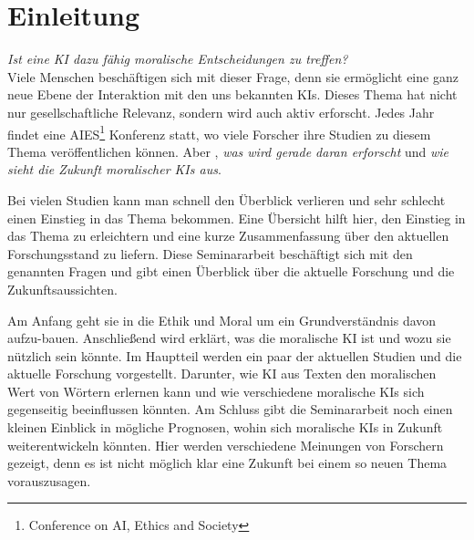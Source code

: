 \section{Einleitung}\label{sec:einleitung}

\textit{Ist eine KI dazu fähig moralische Entscheidungen zu treffen?} \\
Viele Menschen beschäftigen sich mit dieser Frage, denn sie ermöglicht eine
ganz neue Ebene der Interaktion mit den uns bekannten KIs.
Dieses Thema hat nicht nur gesellschaftliche Relevanz, sondern wird auch
aktiv erforscht.
Jedes Jahr findet eine AIES\footnote{Conference on AI, Ethics and Society} Konferenz statt, wo viele
Forscher ihre Studien zu diesem Thema veröffentlichen können.
Aber , \textit{was wird gerade daran erforscht} und \textit{wie sieht die Zukunft moralischer KIs aus}.

Bei vielen Studien kann man schnell den Überblick verlieren und sehr schlecht einen Einstieg in das Thema bekommen.
Eine Übersicht hilft hier, den Einstieg in das Thema zu erleichtern und eine kurze Zusammenfassung über
den aktuellen Forschungsstand zu liefern.
Diese Seminararbeit beschäftigt sich mit den genannten Fragen und gibt einen Überblick über die aktuelle Forschung und die Zukunftsaussichten.

Am Anfang geht sie in die Ethik und Moral um ein Grundverständnis davon aufzu-bauen.
Anschließend wird erklärt, was die moralische KI ist und wozu sie nützlich sein könnte.
Im Hauptteil werden ein paar der aktuellen Studien und die aktuelle Forschung vorgestellt.
Darunter, wie KI aus Texten den moralischen Wert von Wörtern erlernen kann und wie verschiedene moralische
KIs sich gegenseitig beeinflussen könnten.
Am Schluss gibt die Seminararbeit noch einen kleinen Einblick in mögliche Prognosen, wohin sich
moralische KIs in Zukunft weiterentwickeln könnten.
Hier werden verschiedene Meinungen von Forschern gezeigt, denn es ist nicht möglich klar eine
Zukunft bei einem so neuen Thema vorauszusagen.


